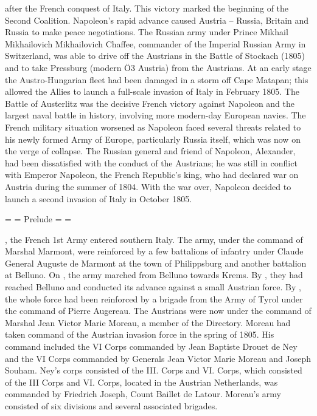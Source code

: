 after the French conquest of Italy. This victory marked the beginning of the Second Coalition. Napoleon's rapid advance caused Austria – Russia, Britain and Russia to make peace negotiations. The Russian army under Prince Mikhail Mikhailovich Mikhailovich Chaffee, commander of the Imperial Russian Army in Switzerland, was able to drive off the Austrians in the Battle of Stockach (1805) and to take Pressburg (modern \"{O}3 Austria) from the Austrians. At an early stage the Austro-Hungarian fleet had been damaged in a storm off Cape Matapan; this allowed the Allies to launch a full-scale invasion of Italy in February 1805. The Battle of Austerlitz was the decisive French victory against Napoleon and the largest naval battle in history, involving more modern-day European navies. 
The French military situation worsened as Napoleon faced several threats related to his newly formed Army of Europe, particularly Russia itself, which was now on the verge of collapse. The Russian general and friend of Napoleon, Alexander, had been dissatisfied with the conduct of the Austrians; he was still in conflict with Emperor Napoleon, the French Republic's king, who had declared war on Austria during the summer of 1804. With the war over, Napoleon decided to launch a second invasion of Italy in October 1805. 

= = Prelude = = 

, the French 1st Army entered southern Italy. The army, under the command of Marshal Marmont, were reinforced by a few battalions of infantry under Claude General Auguste de Marmont at the town of Philippsburg and another battalion at Belluno. On , the army marched from Belluno towards Krems. By , they had reached Belluno and conducted its advance against a small Austrian force. By , the whole force had been reinforced by a brigade from the Army of Tyrol under the command of Pierre Augereau. 
The Austrians were now under the command of Marshal Jean Victor Marie Moreau, a member of the Directory. Moreau had taken command of the Austrian invasion force in the spring of 1805. His command included the VI Corps commanded by Jean Baptiste Drouet de Ney and the VI Corps commanded by Generals Jean Victor Marie Moreau and Joseph Souham. Ney's corps consisted of the III. Corps and VI. Corps, which consisted of the III Corps and VI. Corps, located in the Austrian Netherlands, was commanded by Friedrich Joseph, Count Baillet de Latour. Moreau's army consisted of six divisions and several associated brigades. 

